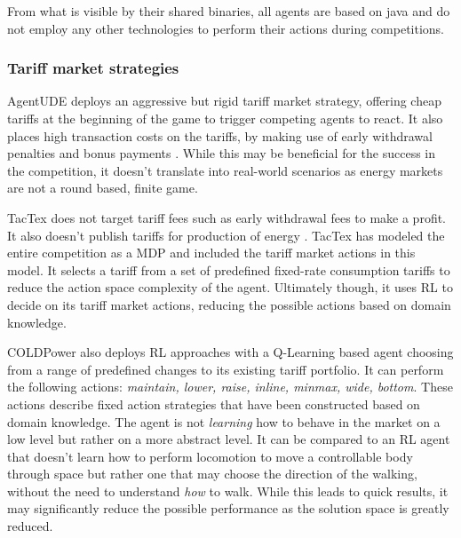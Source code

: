 From what is visible by their shared binaries, all agents are based on java and do not employ any other technologies to
perform their actions during competitions.

\subsubsection{Tariff market strategies}%
\label{ssub:tariff_market_strategies}

AgentUDE deploys an aggressive but rigid tariff market strategy, offering cheap tariffs at the beginning of the game to
trigger competing agents to react. It also places high transaction costs on the tariffs, by making use of early
withdrawal penalties and bonus payments \cite[]{ozdemir2017strategy}. While this may be beneficial for the success in the
competition, it doesn't translate into real-world scenarios as energy markets are not a round based, finite game.

TacTex does not target tariff fees such as early withdrawal fees to make a profit. It also doesn't publish tariffs for
production of energy \cite[]{tactexurieli2016mdp}. TacTex has modeled the entire competition as a \ac{MDP} and included the
tariff market actions in this model. It selects a tariff from a set of predefined fixed-rate consumption tariffs to
reduce the action space complexity of the agent. Ultimately though, it uses \ac{RL} to decide on its tariff market
actions, reducing the possible actions based on domain knowledge.

COLDPower also deploys \ac{RL} approaches with a Q-Learning based agent choosing from a range of predefined changes to
its existing tariff portfolio. It can perform the following actions: \emph{maintain, lower, raise, inline, minmax, wide,
bottom}. These actions describe fixed action strategies that have been constructed based on domain knowledge. The agent
is not \emph{learning} how to behave in the market on a low level but rather on a more abstract level. It can be
compared to an \ac{RL} agent that doesn't learn how to perform locomotion to move a controllable body through space but
rather one that may choose the direction of the walking, without the need to understand \emph{how} to walk. While this
leads to quick results, it may significantly reduce the possible performance as the solution space is greatly reduced.

